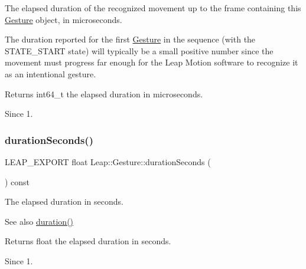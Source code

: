 The elapsed duration of the recognized movement up to the frame containing this \hyperlink{class_leap_1_1_gesture}{Gesture} object, in microseconds.


\begin{DoxyCodeInclude}
\end{DoxyCodeInclude}


The duration reported for the first \hyperlink{class_leap_1_1_gesture}{Gesture} in the sequence (with the S\+T\+A\+T\+E\+\_\+\+S\+T\+A\+RT state) will typically be a small positive number since the movement must progress far enough for the Leap Motion software to recognize it as an intentional gesture.

\begin{DoxyReturn}{Returns}
int64\+\_\+t the elapsed duration in microseconds. 
\end{DoxyReturn}
\begin{DoxySince}{Since}
1. 
\end{DoxySince}
\mbox{\label{class_leap_1_1_gesture_ac2e5253feac96ab37e6ede21e26c2640}} 
\subsubsection{\texorpdfstring{duration\+Seconds()}{durationSeconds()}}
{\footnotesize\ttfamily L\+E\+A\+P\+\_\+\+E\+X\+P\+O\+RT float Leap\+::\+Gesture\+::duration\+Seconds (\begin{DoxyParamCaption}{ }\end{DoxyParamCaption}) const}

The elapsed duration in seconds.


\begin{DoxyCodeInclude}
\end{DoxyCodeInclude}


\begin{DoxySeeAlso}{See also}
\hyperlink{class_leap_1_1_gesture_a5f2342e2fca1949880a042a76f147cec}{duration()} 
\end{DoxySeeAlso}
\begin{DoxyReturn}{Returns}
float the elapsed duration in seconds. 
\end{DoxyReturn}
\begin{DoxySince}{Since}
1. 
\end{DoxySince}
\mbox{\label{class_leap_1_1_gesture_aed7615e15842187e1841b22d36147b70}} 
